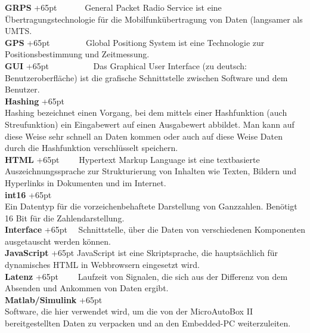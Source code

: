 \documentclass[fontsize = 12pt, paper = a4]{scrreprt}
\begin{document}
\textbf{GRPS}
\hangindent+65pt  
\ \ \ \ \ \ General Packet Radio Service ist eine Übertragungstechnologie für die Mobilfunkübertragung von Daten (langsamer als UMTS.\\

\textbf{GPS}
\hangindent+65pt  
\ \ \ \ \ \ \  \ Global Positiong System ist eine Technologie zur Positionsbestimmung und Zeitmessung.\\

\textbf{GUI}
\hangindent+65pt  
\ \ \ \ \ \ \ \ \ \   Das Graphical User Interface (zu deutsch: Benutzeroberfläche) ist die graf\-ische Schnittstelle zwischen Software und dem Benutzer.\\

\textbf{Hashing}
\hangindent+65pt  \\
Hashing bezeichnet einen Vorgang, bei dem mittels einer Hashfunktion (auch Streufunktion) ein Eingabewert auf einen Ausgabewert abbildet. Man kann auf diese Weise sehr schnell an Daten kommen oder auch auf diese Weise Daten durch die Hashfunktion verschlüsselt speichern.\\

\textbf{HTML}
\hangindent+65pt 
\ \ \ \ Hypertext Markup Language ist eine textbasierte Auszeichnungssprache zur Strukturierung von Inhalten wie Texten, Bildern und Hyperlinks in Dokumenten und im Internet.\\

\textbf{int16}
\hangindent+65pt  \\
Ein Datentyp für die vorzeichenbehaftete Darstellung von Ganzzahlen. Benötigt 16 Bit für die Zahlendarstellung.\\

\textbf{Interface}
\hangindent+65pt 
\ \ Schnittstelle, über die Daten von verschiedenen Komponenten ausgetauscht werden können.\\

\textbf{JavaScript}
\hangindent+65pt 
JavaScript ist eine Skriptsprache, die hauptsächlich für dynamisches HTML in Webbrowsern eingesetzt wird. \\

\textbf{Latenz}
\hangindent+65pt 
\ \ \ \ Laufzeit von Signalen, die sich aus der Differenz von dem Absenden und Ankommen von Daten ergibt.\\

\textbf{Matlab/Simulink}
\hangindent+65pt  \\
Software, die hier verwendet wird, um die von der MicroAutoBox II bereitgestellten Daten zu verpacken und an den Embedded-PC weiterzuleiten.\\
\end{document}

